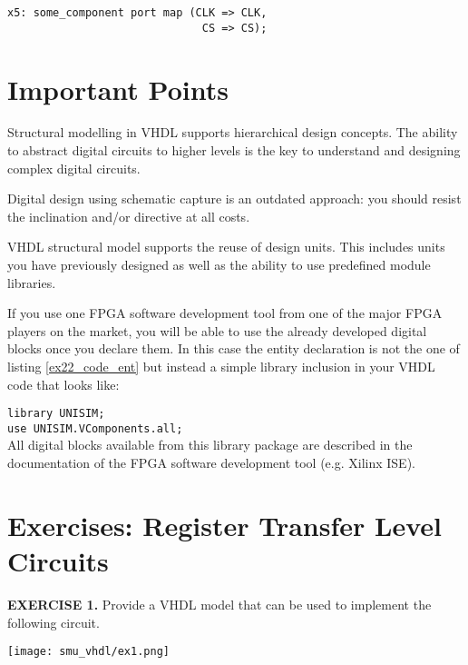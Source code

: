 \begin{lstlisting}[label=ex22_code_same_sig, caption=An example of the same signal name crossing hierarchical boundaries.]
x5: some_component port map (CLK => CLK,
                              CS => CS); 
\end{lstlisting}

\section{Important Points}

\begin{my_list}
\item Structural modelling in VHDL supports hierarchical design concepts. The ability to abstract digital circuits to higher levels is the key to understand and designing complex digital circuits.

\item Digital design using schematic capture is an outdated approach: you should resist the inclination and/or directive at all costs.

\item VHDL structural model supports the reuse of design units. This includes units you have previously designed as well as the ability to use predefined module libraries.

\item If you use one FPGA software development tool from one of the major FPGA players on the market, you will be able to use the already developed digital blocks once you declare them. In this case the entity declaration is not the one of listing \ref{ex22_code_ent} but instead a simple library inclusion in your VHDL code that looks like:

\hspace*{50pt}
\texttt{library UNISIM;}\\
\hspace*{50pt}
\texttt{use UNISIM.VComponents.all;}\\
All digital blocks available from this library package are described in the documentation of the FPGA software development tool (e.g. Xilinx ISE).
\end{my_list}

\section{Exercises: Register Transfer Level Circuits}

\vspace{20pt}
\noindent
\begin{minipage}[t]{0.5\textwidth}
\textbf{EXERCISE 1.}
Provide a VHDL model that can be used to implement the following circuit.
\end{minipage}
\begin{minipage}[t]{0.47\textwidth}
\vspace{0pt}\raggedright
\centering
\texttt{[image: smu\_vhdl/ex1.png]}
\end{minipage}

